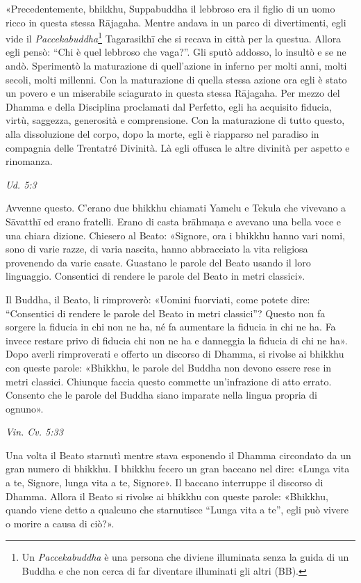 «Precedentemente, bhikkhu, Suppabuddha il lebbroso era il figlio di un
uomo ricco in questa stessa Rājagaha. Mentre andava in un parco di
divertimenti, egli vide il
\emph{Paccekabuddha}\footnote{Un \emph{Paccekabuddha} è una persona che diviene illuminata senza la guida di un Buddha e che non cerca di far diventare illuminati gli altri (BB).} Tagarasikhī che si recava in città
per la questua. Allora egli pensò: “Chi è quel lebbroso che vaga?”. Gli
sputò addosso, lo insultò e se ne andò. Sperimentò la maturazione di
quell’azione in inferno per molti anni, molti secoli, molti millenni.
Con la maturazione di quella stessa azione ora egli è stato un povero e
un miserabile sciagurato in questa stessa Rājagaha. Per mezzo del Dhamma
e della Disciplina proclamati dal Perfetto, egli ha acquisito fiducia,
virtù, saggezza, generosità e comprensione. Con la maturazione di tutto
questo, alla dissoluzione del corpo, dopo la morte, egli è riapparso nel
paradiso in compagnia delle Trentatré Divinità. Là egli offusca le altre
divinità per aspetto e rinomanza.


\emph{Ud. 5:3}


 Avvenne questo. C’erano due bhikkhu chiamati Yamelu e
Tekula che vivevano a Sāvatthī ed erano fratelli. Erano di casta
brāhmaṇa e avevano una bella voce e una chiara dizione. Chiesero al
Beato: «Signore, ora i bhikkhu hanno vari nomi, sono di varie razze, di
varia nascita, hanno abbracciato la vita religiosa provenendo da varie
casate. Guastano le parole del Beato usando il loro linguaggio.
Consentici di rendere le parole del Beato in metri classici».


Il Buddha, il Beato, li rimproverò: «Uomini fuorviati, come potete dire:
“Consentici di rendere le parole del Beato in metri classici”? Questo
non fa sorgere la fiducia in chi non ne ha, né fa aumentare la fiducia
in chi ne ha. Fa invece restare privo di fiducia chi non ne ha e
danneggia la fiducia di chi ne ha». Dopo averli rimproverati e offerto
un discorso di Dhamma, si rivolse ai bhikkhu con queste parole:
«Bhikkhu, le parole del Buddha non devono essere rese in metri classici.
Chiunque faccia questo commette un’infrazione di atto errato. Consento
che le parole del Buddha siano imparate nella lingua propria di ognuno».


\emph{Vin. Cv. 5:33}


Una volta il Beato starnutì mentre stava esponendo il Dhamma circondato
da un gran numero di bhikkhu. I bhikkhu fecero un gran baccano nel dire:
«Lunga vita a te, Signore, lunga vita a te, Signore». Il baccano
interruppe il discorso di Dhamma. Allora il Beato si rivolse ai bhikkhu
con queste parole: «Bhikkhu, quando viene detto a qualcuno che
starnutisce “Lunga vita a te”, egli può vivere o morire a causa di
ciò?».


